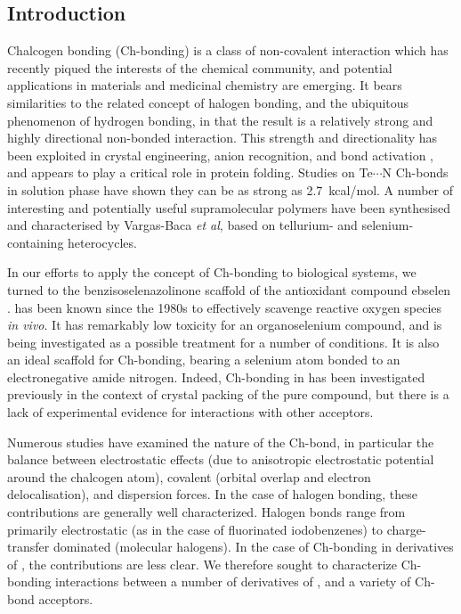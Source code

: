 \begin{refsection}
\section{Introduction}
Chalcogen bonding (Ch-bonding) is a class of non-covalent interaction which has recently piqued the interests of the chemical community, and potential applications in materials and medicinal chemistry are emerging.\autocite{Mitchell2017,Wonner2017a,Fanfrlik2014,Vogel2019}
It bears similarities to the related concept of halogen bonding, and the ubiquitous phenomenon of hydrogen bonding, in that the result is a relatively strong and highly directional non-bonded interaction.\autocite{Paolo1974}
This strength and directionality has been exploited in crystal engineering\autocite{Gleiter2003,Kremer2016,Huynh2017}, anion recognition\autocite{Lim2017,Lim2018,Garrett2016}, and bond activation \autocite{Wonner2017,Benz2017,Benz2017a}, and appears to play a critical role in protein folding\autocite{Iwaoka2001,Iwaoka2015}.
Studies on Te$\cdots$N Ch-bonds in solution phase have shown they can be as strong as 2.7~kcal/mol\autocite{Garrett2015a}.
A number of interesting and potentially useful supramolecular polymers have been synthesised and characterised by Vargas-Baca \emph{et al}, based on tellurium- and selenium-containing heterocycles\autocite{Ho2016,Ho2017}.

In our efforts to apply the concept of Ch-bonding to biological systems, we turned to the benzisoselenazolinone scaffold of the antioxidant compound ebselen .
 has been known since the 1980s to effectively scavenge reactive oxygen species \emph{in vivo}.\autocite{Muller1984}
It has remarkably low toxicity for an organoselenium compound, and is being investigated as a possible treatment for a number of conditions.\autocite{Schewe1995,Kil2007,Singh2013,Parnham2000}
It is also an ideal scaffold for Ch-bonding, bearing a selenium atom bonded to an electronegative amide nitrogen.
Indeed, Ch-bonding in  has been investigated previously in the context of crystal packing of the pure compound, but there is a lack of experimental evidence for interactions with other acceptors.\autocite{Thomas2015}

Numerous studies have examined the nature of the Ch-bond, in particular the balance between electrostatic effects (due to anisotropic electrostatic potential around the chalcogen atom), covalent (orbital overlap and electron delocalisation), and dispersion forces.\autocite{Oliveira2017,Pascoe2017,DeVleeschouwer2017,Kolar2016,Gleiter2018}
In the case of halogen bonding, these contributions are generally well characterized.
Halogen bonds range from primarily electrostatic (as in the case of fluorinated iodobenzenes\autocite{Prasang2009}) to charge-transfer dominated (molecular halogens\autocite{Mulliken1950}).
In the case of Ch-bonding in derivatives of , the contributions are less clear.
We therefore sought to characterize Ch-bonding interactions between a number of derivatives of , and a variety of Ch-bond acceptors.


\end{refsection}
